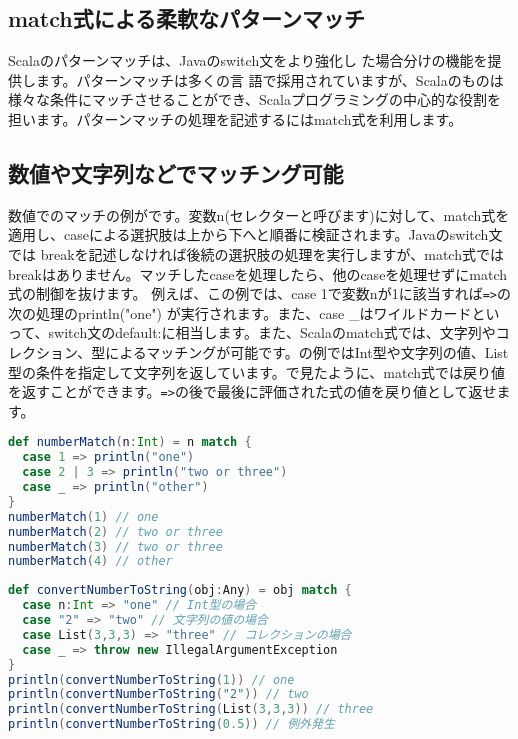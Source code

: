 \subsection{match式による柔軟なパターンマッチ}
Scalaのパターンマッチは、Javaのswitch文をより強化し た場合分けの機能を提供します。パターンマッチは多くの言 語で採用されていますが、Scalaのものは様々な条件にマッチさせることができ、Scalaプログラミングの中心的な役割を担います。パターンマッチの処理を記述するにはmatch式を利用します。

\subsection{数値や文字列などでマッチング可能}
数値でのマッチの例がです。変数n(セレクターと呼びます)に対して、match式を適用し、caseによる選択肢は上から下へと順番に検証されます。Javaのswitch文では breakを記述しなければ後続の選択肢の処理を実行しますが、match式ではbreakはありません。マッチしたcaseを処理したら、他のcaseを処理せずにmatch式の制御を抜けます。 例えば、この例では、case 1で変数nが1に該当すれば\verb|=>|の次の処理のprintln("one") が実行されます。また、case \_はワイルドカードといって、switch文のdefault:に相当します。また、Scalaのmatch式では、文字列やコレクション、型によるマッチングが可能です。の例ではInt型や文字列の値、List型の条件を指定して文字列を返しています。で見たように、match式では戻り値を返すことができます。\verb|=>|の後で最後に評価された式の値を戻り値として返せます。

\begin{lstlisting}[language=scala, label=src:digit_matching, caption=数値のマッチングの例]
def numberMatch(n:Int) = n match {
  case 1 => println("one")
  case 2 | 3 => println("two or three")
  case _ => println("other")
}
numberMatch(1) // one
numberMatch(2) // two or three
numberMatch(3) // two or three
numberMatch(4) // other 
\end{lstlisting}

\begin{lstlisting}[language=scala, label=src:match_expression, caption=match式は値を返す]
def convertNumberToString(obj:Any) = obj match {
  case n:Int => "one" // Int型の場合
  case "2" => "two" // 文字列の値の場合
  case List(3,3,3) => "three" // コレクションの場合
  case _ => throw new IllegalArgumentException
}
println(convertNumberToString(1)) // one
println(convertNumberToString("2")) // two
println(convertNumberToString(List(3,3,3)) // three
println(convertNumberToString(0.5)) // 例外発生 
\end{lstlisting}

